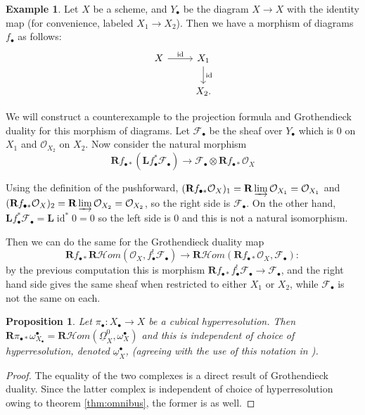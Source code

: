 \documentclass{report}
\newtheorem{prop}[theorem]{Proposition}
\theoremstyle{definition}
\newtheorem{example}[theorem]{Example}
\newcommand{\cHom}{\mathcal{H} \textit{om}}
\DeclareMathOperator{\id}{id}
\newcommand{\FF}{\mathscr{F}}
\newcommand{\bL}{\textbf{L}}
\newcommand{\OO}{\mathcal{O}}
\newcommand{\bR}{\textbf{R}}
\newcommand{\DB}{\underline{\Omega}}
\newcommand{\db}{\underline{\omega}^\bullet}
\begin{document}
\begin{example}
	Let $X$ be a scheme, and $Y_\bullet$ be the diagram $X \rightarrow X$ with the identity map (for convenience, labeled $X_1 \rightarrow X_2$).
	Then we have a morphism of diagrams $f_\bullet$ as follows:
	\[
	\begin{tikzcd}
		X \arrow{r}{\id} & X_1 \arrow{d}{\id} \\
		& X_2.
	\end{tikzcd}
	\]
	
	We will construct a counterexample to the projection formula and Grothendieck duality for this morphism of diagrams.
	Let $\FF_\bullet$ be the sheaf over $Y_\bullet$ which is 0 on $X_1$ and $\OO_{X_2}$ on $X_2$.
	Now consider the natural morphism
	\[
		\bR f_{\bullet *} (\bL f_\bullet^* \FF_\bullet) \rightarrow \FF_\bullet \otimes \bR f_{\bullet *} \OO_X
	\]
	
	Using the definition of the pushforward, $(\bR f_{\bullet *} \OO_X)_1 = \bR \varinjlim \OO_{X_1} = \OO_{X_1}$ and $(\bR f_{\bullet *} \OO_X)_2 = \bR \varinjlim \OO_{X_2} = \OO_{X_2}$, so the right side is $\FF_\bullet$.
	On the other hand, $\bL f_\bullet^* \FF_\bullet = \bL \id^* 0 = 0$ so the left side is 0 and this is not a natural isomorphism.
	
	Then we can do the same for the Grothendieck duality map
	\[
		\bR f_{\bullet *} \bR \cHom(\OO_X, f_\bullet^! \FF_\bullet) \rightarrow \bR \cHom(\bR f_{\bullet *} \OO_X , \FF_\bullet):
	\]
	by the previous computation this is morphism $\bR f_{\bullet *} f_\bullet^! \FF_\bullet \rightarrow \FF_\bullet$, and the right hand side gives the same sheaf when restricted to either $X_1$ or $X_2$, while $\FF_\bullet$ is not the same on each.
\end{example}

\begin{prop}
	Let $\pi_\bullet : X_\bullet \rightarrow X$ be a cubical hyperresolution.
	Then $\bR \pi_{\bullet *} \omega_{X_\bullet}^\bullet = \bR \cHom(\DB_X^0,\omega_X^\bullet)$ and this is independent of choice of hyperresolution, denoted $\db_X$, (agreeing with the use of this notation in \cite{Kovacs2011a}).
\end{prop}
\begin{proof}
	The equality of the two complexes is a direct result of Grothendieck duality.
	Since the latter complex is independent of choice of hyperresolution owing to theorem \ref{thm:omnibus}, the former is as well.
\end{proof}
\end{document}
